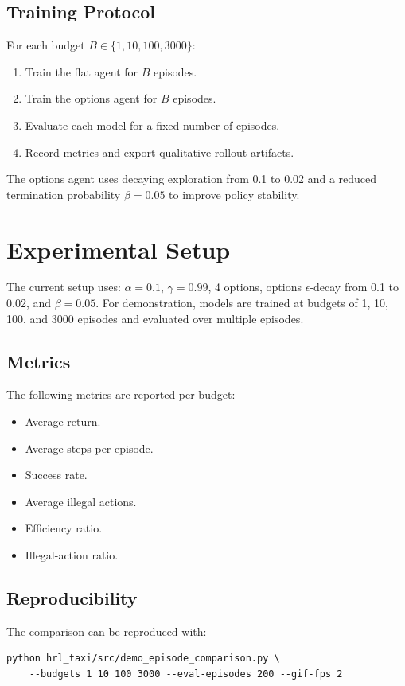 \documentclass[conference]{IEEEtran}
\begin{document}
\subsection{Training Protocol}
For each budget $B \in \{1,10,100,3000\}$:
\begin{enumerate}
\item Train the flat agent for $B$ episodes.
\item Train the options agent for $B$ episodes.
\item Evaluate each model for a fixed number of episodes.
\item Record metrics and export qualitative rollout artifacts.
\end{enumerate}

The options agent uses decaying exploration from 0.1 to 0.02 and a reduced termination probability $\beta=0.05$ to improve policy stability.

\section{Experimental Setup}
The current setup uses: $\alpha=0.1$, $\gamma=0.99$, 4 options, options $\epsilon$-decay from 0.1 to 0.02, and $\beta=0.05$. For demonstration, models are trained at budgets of 1, 10, 100, and 3000 episodes and evaluated over multiple episodes.

\subsection{Metrics}
The following metrics are reported per budget:
\begin{itemize}
\item Average return.
\item Average steps per episode.
\item Success rate.
\item Average illegal actions.
\item Efficiency ratio.
\item Illegal-action ratio.
\end{itemize}

\subsection{Reproducibility}
The comparison can be reproduced with:
\begin{verbatim}
python hrl_taxi/src/demo_episode_comparison.py \
	--budgets 1 10 100 3000 --eval-episodes 200 --gif-fps 2
\end{verbatim}
\end{document}
